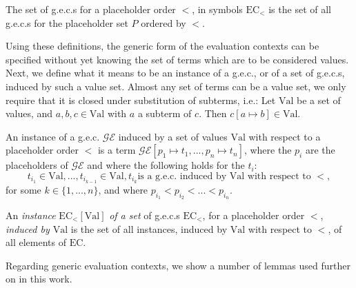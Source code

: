 \begin{definition}
The set of g.e.c.s for a placeholder order $<$, in symbols $\textrm{EC}_<$ is the set of all g.e.c.s for the placeholder set $P$ ordered by $<$.
\end{definition}

Using these definitions, the generic form of the evaluation contexts can be specified without yet knowing the set of terms which are to be considered values. Next, we define what it means to be an instance of a g.e.c., or of a set of g.e.c.s, induced by such a value set. Almost any set of terms can be a value set, we only require that it is closed under substitution of subterms, i.e.: Let $\textrm{Val}$ be a set of values, and $a, b, c \in \textrm{Val}$ with $a$ a subterm of $c$. Then $c[a \mapsto b] \in \textrm{Val}$.

\begin{definition}[Instance of a g.e.c.]
An instance of a g.e.c. $\mathcal{GE}$ induced by a set of values $\textrm{Val}$ with respect to  a placeholder order $<$ is a term $\mathcal{GE}[p_1 \mapsto t_1, ..., p_n \mapsto t_n]$, where the $p_i$ are the placeholders of $\mathcal{GE}$ and where the following holds for the $t_i$:
\[
t_{i_1} \in \textrm{Val}, ..., t_{i_{k-1}} \in \textrm{Val}, t_{i_k} \textrm{is a g.e.c. induced by Val with respect to } <,
\]
for some $k \in \{1, ..., n\}$, and where $p_{i_1} < p_{i_2} < ... < p_{i_n}$.
\end{definition}

\begin{definition}
An \textit{instance} $\textrm{EC}_<[\textrm{Val}]$ \textit{of a set} of g.e.c.s $\textrm{EC}_<$, for a placeholder order $<$, \textit{induced by $\textrm{Val}$} is the set of all instances, induced by $\textrm{Val}$ with respect to $<$, of all elements of $\textrm{EC}$.
\end{definition}

Regarding generic evaluation contexts, we show a number of lemmas used further on in this work.

